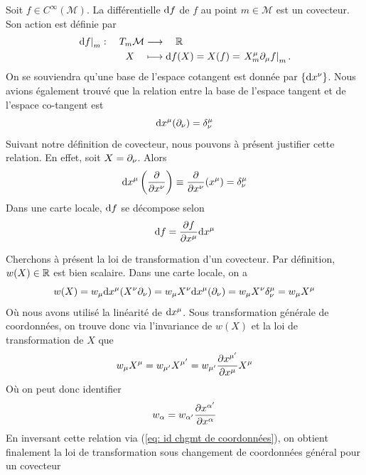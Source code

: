 \begin{exmp}
    Soit $f\in C^\infty(\mathcal{M})$. La différentielle $\mathrm{d} f$ de $f$ au point $m\in \mathcal{M}$ est un covecteur. Son action est définie par
    \begin{align*}
        \left. \mathrm{d} f \right|_m : \quad T_m \mathcal{M} &\longrightarrow \quad  \mathbb{R} \\
        X \quad&\longmapsto \mathrm{d} f (X) = X(f) = \left. X^\mu_m \partial_\mu f \right|_m.
    \end{align*}
    On se souviendra qu'une base de l'espace cotangent est donnée par $\{ \mathrm{d} x^\nu\}$. Nous avions également trouvé que la relation entre la base de l'espace tangent et de l'espace co-tangent est
    \begin{equation}
        \td  x^\mu (\pd_\nu) = \delta\indices*{^\mu_\nu}
    \end{equation}
    Suivant notre définition de covecteur, nous pouvons à présent justifier cette relation. En effet, soit $X = \partial_\nu$. Alors
    \begin{equation}
        \td x^\mu \lt \frac{\pd}{\pd x^\nu}\rt \equiv \frac{\pd}{\pd x^\nu}(x^\mu) = \delta\indices*{^\mu_\nu}
    \end{equation}
    Dans une carte locale, $\mathrm{d} f$ se décompose selon
    \begin{equation}
        \mathrm{d} f = \frac{\partial f}{\partial x^\mu} \mathrm{d} x^\mu
    \end{equation}
\end{exmp}
\cutebreak
Cherchons à présent la loi de transformation d'un covecteur. Par définition, $w(X) \in \mathbb{R}$ est bien scalaire. Dans une carte locale, on a
\begin{equation}
    w(X) = w_\mu \td x^\mu (X^\nu \pd_\nu ) = w_\mu X^\nu \td x^\mu (\pd_\nu) = w_\mu X^\nu \delta\indices*{^\mu_\nu} = w_\mu X^\mu
\end{equation}
Où nous avons utilisé la linéarité de $\mathrm{d} x^\mu$. Sous transformation générale de coordonnées, on trouve donc via l'invariance de $w(X)$ et la loi de transformation de $X$ que
\begin{equation}
    w_\mu X^\mu = w_{\mu'} X^{\mu'} = w_{\mu'} \frac{\partial x^{\mu'}}{\partial x^\mu} X^\mu
\end{equation}
Où on peut donc identifier
\begin{equation}
    w_\alpha = w_{\alpha'} \frac{\partial x^{\alpha'}}{\partial x^\alpha}
\end{equation}
En inversant cette relation via (\ref{eq: id chgmt de coordonnées}), on obtient finalement la loi de transformation sous changement de coordonnées général pour un covecteur

